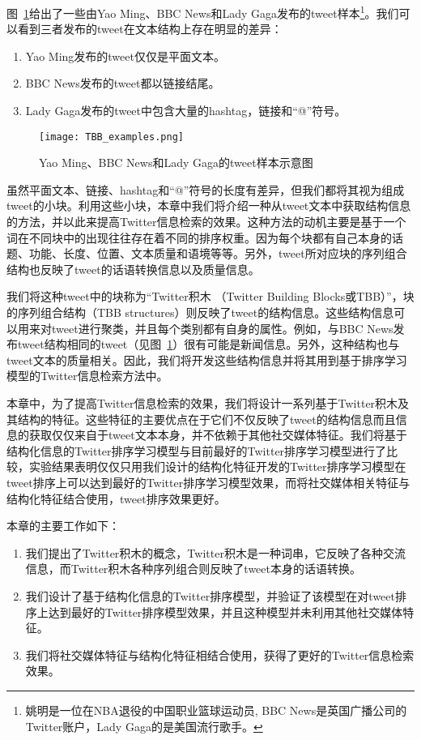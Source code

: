 图~\ref{TBB_examples}给出了一些由Yao Ming、BBC News和Lady Gaga发布的tweet样本\footnote{姚明是一位在NBA退役的中国职业篮球运动员, BBC News是英国广播公司的Twitter账户，Lady Gaga的是美国流行歌手。}。我们可以看到三者发布的tweet在文本结构上存在明显的差异：
  \begin{enumerate}
  \item Yao Ming发布的tweet仅仅是平面文本。
  \item BBC News发布的tweet都以链接结尾。
  \item Lady Gaga发布的tweet中包含大量的hashtag，链接和“@”符号。
  \end{enumerate}  

\begin{figure}[htp]
\centering
\texttt{[image: TBB\_examples.png]}
\caption{Yao Ming、BBC News和Lady Gaga的tweet样本示意图}
\label{TBB_examples}
\end{figure}

虽然平面文本、链接、hashtag和“@”符号的长度有差异，但我们都将其视为组成tweet的小块。利用这些小块，本章中我们将介绍一种从tweet文本中获取结构信息的方法，并以此来提高Twitter信息检索的效果。这种方法的动机主要是基于一个词在不同块中的出现往往存在着不同的排序权重。因为每个块都有自己本身的话题、功能、长度、位置、文本质量和语境等等。另外，tweet所对应块的序列组合结构也反映了tweet的话语转换信息以及质量信息。

我们将这种tweet中的块称为“Twitter积木 （Twitter Building Blocks或TBB）”，块的序列组合结构（TBB structures）则反映了tweet的结构信息。这些结构信息可以用来对tweet进行聚类，并且每个类别都有自身的属性。例如，与BBC News发布tweet结构相同的tweet（见图~\ref{TBB_examples}）很有可能是新闻信息。另外，这种结构也与tweet文本的质量相关。因此，我们将开发这些结构信息并将其用到基于排序学习模型的Twitter信息检索方法中。

本章中，为了提高Twitter信息检索的效果，我们将设计一系列基于Twitter积木及其结构的特征。这些特征的主要优点在于它们不仅反映了tweet的结构信息而且信息的获取仅仅来自于tweet文本本身，并不依赖于其他社交媒体特征。我们将基于结构化信息的Twitter排序学习模型与目前最好的Twitter排序学习模型进行了比较，实验结果表明仅仅只用我们设计的结构化特征开发的Twitter排序学习模型在tweet排序上可以达到最好的Twitter排序学习模型效果，而将社交媒体相关特征与结构化特征结合使用，tweet排序效果更好。

本章的主要工作如下：
  \begin{enumerate}
  \item 我们提出了Twitter积木的概念，Twitter积木是一种词串，它反映了各种交流信息，而Twitter积木各种序列组合则反映了tweet本身的话语转换。
  \item 我们设计了基于结构化信息的Twitter排序模型，并验证了该模型在对tweet排序上达到最好的Twitter排序模型效果，并且这种模型并未利用其他社交媒体特征。
  \item 我们将社交媒体特征与结构化特征相结合使用，获得了更好的Twitter信息检索效果。
  \end{enumerate}  

